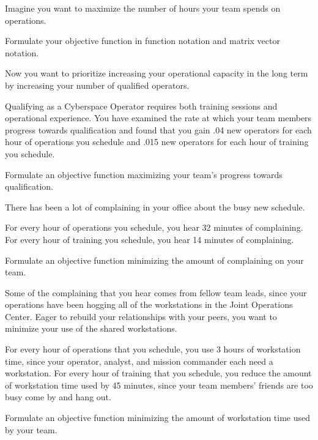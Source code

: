 \documentclass[11pt]{article}
\begin{document}


\leavevmode\hspace*{\parindent}Imagine you want to maximize the number of hours your team spends on operations. 

Formulate your objective function in function notation and matrix vector notation. 

\vfill

Now you want to prioritize increasing your operational capacity in the long term by increasing your number of qualified operators. 

Qualifying as a Cyberspace Operator requires both training sessions and operational experience. 
You have examined the rate at which your team members progress towards qualification and found that you gain .04 new operators for each hour of operations you schedule and .015 new operators for each hour of training you schedule. 

Formulate an objective function maximizing your team's progress towards qualification.

\vfill


\leavevmode\hspace*{\parindent}There has been a lot of complaining in your office about the busy new schedule. 

For every hour of operations you schedule, you hear 32 minutes of complaining. 
For every hour of training you schedule, you hear 14 minutes of complaining. 

Formulate an objective function minimizing the amount of complaining on your team.

\vfill

Some of the complaining that you hear comes from fellow team leads, since your operations have been hogging all of the workstations in the Joint Operations Center. 
Eager to rebuild your relationships with your peers, you want to minimize your use of the shared workstations. 

For every hour of operations that you schedule, you use 3 hours of workstation time, since your operator, analyst, and mission commander each need a workstation. 
For every hour of training that you schedule, you reduce the amount of workstation time used by 45 minutes, since your team members' friends are too busy come by and hang out. 

Formulate an objective function minimizing the amount of workstation time used by your team.
\end{document}
